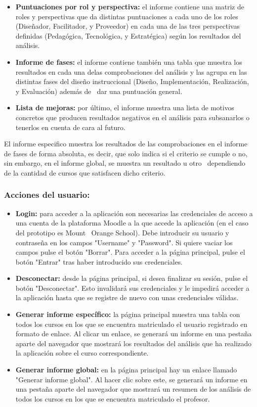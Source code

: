 \begin{itemize}
	\item
	\textbf{Puntuaciones por rol y perspectiva:} el informe contiene una
	matriz de roles y perspectivas que da distintas puntuaciones a cada
	uno de los roles (Diseñador, Facilitador, y Proveedor) en cada una de
	las tres perspectivas definidas (Pedagógica, Tecnológica, y
	Estratégica) según los resultados del análisis.
	\item
	\textbf{Informe de fases:} el informe contiene también una tabla que
	muestra los resultados en cada una delas comprobaciones del análisis y
	las agrupa en las distintas fases del diseño instruccional (Diseño,
	Implementación, Realización, y Evaluación) además de ~dar una
	puntuación general.
	\item
	\textbf{Lista de mejoras:} por último, el informe muestra una lista de
	motivos concretos que producen resultados negativos en el análisis
	para subsanarlos o tenerlos en cuenta de cara al futuro.
\end{itemize}

El informe especifico muestra los resultados de las comprobaciones en el
informe de fases de forma absoluta, es decir, que solo indica si el
criterio se cumple o no, sin embargo, en el informe global, se muestra
un resultado u otro ~dependiendo de la cantidad de cursos que satisfacen
dicho criterio.


\subsubsection{Acciones del usuario:}

\begin{itemize}
	\item
	\textbf{Login:} para acceder a la aplicación son necesarias las
	credenciales de acceso a una cuenta de la plataforma Moodle a la que
	accede la aplicación (en el caso del prototipo es Mount ~Orange
	School). Debe introducir su usuario y contraseña en los campos
	"Username" y "Password". Si quiere vaciar los campos pulse el botón
	"Borrar". Para acceder a la página principal, pulse el botón "Entrar"
	tras haber introducido sus credenciales.
	\item
	\textbf{Desconectar:} desde la página principal, si desea finalizar su
	sesión, pulse el botón "Desconectar". Esto invalidará sus credenciales
	y le impedirá acceder a la aplicación hasta que se registre de nuevo
	con unas credenciales válidas.
	\item
	\textbf{Generar informe específico:} la página principal muestra una
	tabla con todos los cursos en los que se encuentra matriculado el
	usuario registrado en formato de enlace. Al clicar un enlace, se
	generará un informe en una pestaña aparte del navegador que mostrará
	los resultados del análisis que ha realizado la aplicación sobre el
	curso correspondiente.
	\item
	\textbf{Generar informe global:} en la página principal hay un enlace
	llamado "Generar informe global". Al hacer clic sobre este, se
	generará un informe en una pestaña aparte del navegador que mostrará
	un resumen de los análisis de todos los cursos en los que se encuentra
	matriculado el profesor.
\end{itemize}

